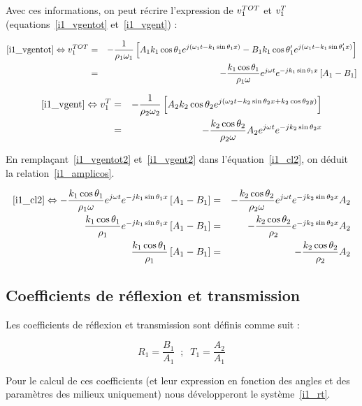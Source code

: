 Avec ces informations, on peut récrire l'expression de $v^{TOT}_1$ et $v^T_1$ (equations~\eqref{i1_vgentot}
et~\eqref{i1_vgent}) :

\begin{eqnarray}
    \eqref{i1_vgentot}  \Leftrightarrow v^{TOT}_1 & = & -\frac{1}{\rho_1\omega_1}\left[A_1k_1\cos\theta_1e^{j(\omega_1t-k_1\sin\theta_1x)} -
            B_1k_1\cos\theta_1'e^{j(\omega_1t-k_1\sin\theta_1'x)}\right] \notag\\
            & = & -\frac{k_1\cos\theta_1}{\rho_1\omega}e^{j\omega t}e^{-jk_1\sin\theta_1x}\left[A_1 - B_1\right] \label{i1_vgentot2}
\end{eqnarray}

\begin{eqnarray}
    \eqref{i1_vgent} \Leftrightarrow v^T_1 & = &
    -\frac{1}{\rho_2\omega_2}\left[A_2k_2\cos\theta_2e^{j(\omega_2t-k_2\sin\theta_2x+k_2\cos\theta_2y)}\right]\notag\\
    & = & -\frac{k_2\cos\theta_2}{\rho_2\omega}A_2e^{j\omega t}e^{-jk_2\sin\theta_2x}\label{i1_vgent2}
\end{eqnarray}

En remplaçant~\eqref{i1_vgentot2} et~\eqref{i1_vgent2} dans l'équation~\eqref{i1_cl2}, on déduit la relation~\eqref{i1_amplicos}.

\begin{eqnarray}
        \eqref{i1_cl2} \Leftrightarrow -\frac{k_1\cos\theta_1}{\rho_1\omega}e^{j\omega t}e^{-jk_1\sin\theta_1x}\left[A_1 - B_1\right] & =
            & -\frac{k_2\cos\theta_2}{\rho_2\omega}e^{j\omega t}e^{-jk_2\sin\theta_2x}A_2\notag\\
        \frac{k_1\cos\theta_1}{\rho_1}e^{-jk_1\sin\theta_1x}\left[A_1 - B_1\right] & =
            & -\frac{k_2\cos\theta_2}{\rho_2}e^{-jk_2\sin\theta_2x}A_2\notag\\
        \frac{k_1\cos\theta_1}{\rho_1}\left[A_1 - B_1\right] & =
    & -\frac{k_2\cos\theta_2}{\rho_2}A_2\label{i1_amplicos}
\end{eqnarray}

\subsection{Coefficients de réflexion et transmission}

Les coefficients de réflexion et transmission sont définis comme suit :

$$R_1 = \frac{B_1}{A_1} \;\;;\;\; T_1 = \frac{A_2}{A_1}$$

Pour le calcul de ces coefficients (et leur expression en fonction des angles et des paramètres des milieux uniquement)
nous développeront le système~\eqref{i1_rt}.

